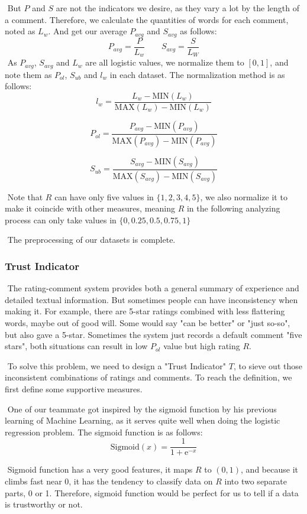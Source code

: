 \documentclass[12pt]{article}  %
\begin{document}
​		But $P$ and $S$ are not the indicators we desire, as they vary a lot by the length of a comment. Therefore, we calculate the quantities of words for each comment, noted as $L_{w}$. And get our average $P_{avg}$ and $S_{avg}$ as follows:
$$
P_{avg} = \frac{P}{L_{w}}
\quad\quad
S_{avg} = \frac{S}{L_{W}}
$$
​		As  $P_{avg}$, $S_{avg}$ and $L_{w}$ are all logistic values, we normalize them to $[0,1]$, and note them as $P_{ol}$,  $S_{ub}$ and $l_{w}$ in each dataset. The normalization method is as follows:
$$
l_{w} = \frac{L_{w} - \mathrm{MIN}(L_{w})}{\mathrm{MAX}(L_{w}) - \mathrm{MIN}(L_{w})}
$$

$$
P_{ol} = \frac{P_{avg} - \mathrm{MIN}(P_{avg})}{\mathrm{MAX}(P_{avg}) - \mathrm{MIN}(P_{avg})}
$$

$$
S_{ub} = \frac{S_{avg} - \mathrm{MIN}(S_{avg})}{\mathrm{MAX}(S_{avg}) - \mathrm{MIN}(S_{avg})}
$$

​		Note that $R$ can have only five values in $\{1,2,3,4,5\}$, we also normalize it to make it coincide with other measures, meaning $R$ in the following analyzing process can only take values in $\{0,0.25,0.5,0.75,1\}$

​		The preprocessing of our datasets is complete.

\subsubsection{Trust Indicator}

​		The rating-comment system provides both a general summary of experience and detailed textual information. But sometimes people can have inconsistency when making it. For example, there are 5-star ratings combined with less flattering words, maybe out of good will. Some would say "can be better" or "just so-so", but also gave a 5-star. Sometimes the system just records a default comment "five stars", both situations can result in low $P_{ol}$ value but high rating $R$.

​		To solve this problem, we need to design a "Trust Indicator" $T$, to sieve out those inconsistent combinations of ratings and comments. To reach the definition, we first define some supportive measures.

​		One of our teammate got inspired by the sigmoid function by his previous learning of Machine Learning, as it serves quite well when doing the logistic regression problem. The sigmoid function is as follows:
$$
\mathrm{Sigmoid}(x) = \frac{1}{1+\mathrm{e}^{-x}}
$$


​		Sigmoid function has a very good features, it maps $R$ to $(0,1)$, and because it climbs fast near 0, it has the tendency to classify data on $R$ into two separate parts, 0 or 1. Therefore, sigmoid function would be perfect for us to tell if a data is trustworthy or not.
\end{document}
